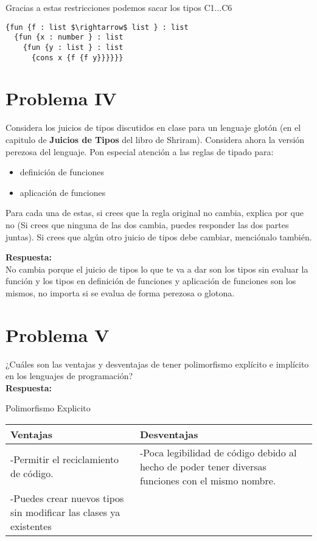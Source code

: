 \documentclass{article}
\begin{document}
Gracias a estas restricciones podemos sacar los tipos C1...C6
\begin{lstlisting}
{fun {f : list $\rightarrow$ list } : list
  {fun {x : number } : list
    {fun {y : list } : list
      {cons x {f {f y}}}}}}
\end{lstlisting}


\section*{Problema IV}
Considera los juicios de tipos discutidos en clase para un lenguaje glotón
(en el capitulo de \textbf{Juicios de Tipos} del libro de Shriram).
Considera ahora la versión perezosa del lenguaje. Pon especial atención a
las reglas de tipado para:

\begin{itemize}
\item definición de funciones
\item aplicación de funciones
\end{itemize}

Para cada una de estas, si crees que la regla original no cambia, explica por que no
(Si crees que ninguna de las dos cambia, puedes responder las dos partes juntas).
Si crees que algún otro juicio de tipos debe cambiar, menciónalo también.

{\bf Respuesta: }\\

No cambia porque el juicio de tipos lo que te va a dar son los tipos sin evaluar la función y los tipos en definición de funciones y aplicación de funciones
son los mismos, no importa si se evalua de forma perezosa o glotona.

\section*{Problema V}
¿Cuáles son las ventajas y desventajas de tener polimorfismo explícito e implícito
en los lenguajes de programación?
\\
\textbf{Respuesta: }
\\


\begin{center}
Polimorfismo Explicito
\end{center}
\begin{tabularx}{\textwidth}{X|X}
	  \textbf{Ventajas} & \textbf{Desventajas} \\
	\hline
	-Permitir el reciclamiento de código. & -Poca legibilidad de código debido al hecho de poder tener diversas funciones con el mismo nombre. \\
	-Puedes crear nuevos tipos sin modificar las clases ya existentes & \\
\end{tabularx}
\end{document}
